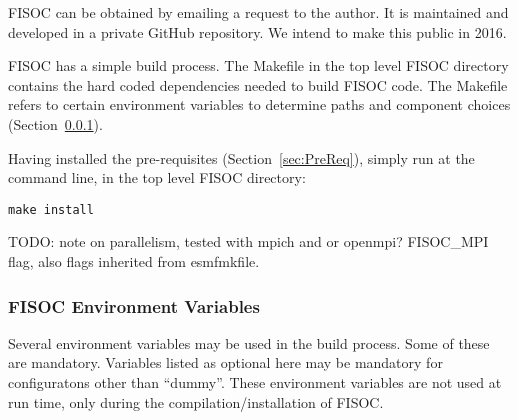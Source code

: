 \documentclass[12pt]{article}
\begin{document}
FISOC can be obtained by emailing a request to the author.  It is maintained and developed in a 
private GitHub repository.  We intend to make this public in 2016.

FISOC has a simple build process.  The Makefile in the top level FISOC directory contains the 
hard coded dependencies needed to build FISOC code.  The Makefile refers to certain 
environment variables to determine paths and component choices (Section~\ref{sec:EnvVars}). 

Having installed the pre-requisites (Section~\ref{sec:PreReq}), simply run at the command line, 
in the top level FISOC directory:
\begin{lstlisting}
make install
\end{lstlisting}

TODO: note on parallelism, tested with mpich and or openmpi?
FISOC\_MPI flag, also flags inherited from esmfmkfile.

\subsubsection{FISOC Environment Variables}
\label{sec:EnvVars}

Several environment variables may be used in the build process. 
Some of these are mandatory. 
Variables listed as optional here may be mandatory for configuratons other than 
``dummy''.
These environment variables are not used at run time, only during 
the compilation/installation of FISOC.
\end{document}
